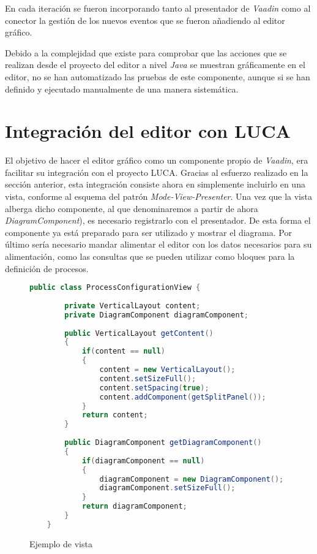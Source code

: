 En cada iteración se fueron incorporando tanto al presentador de \emph{Vaadin} como al conector la gestión de los nuevos eventos que se fueron añadiendo al editor gráfico.

Debido a la complejidad que existe para comprobar que las acciones que se realizan desde el proyecto del editor a nivel \emph{Java} se muestran gráficamente en el editor, no se han automatizado las pruebas de este componente, aunque si se han definido y ejecutado manualmente de una manera sistemática. 

\section{Integración del editor con LUCA}

El objetivo de hacer el editor gráfico como un componente propio de \emph{Vaadin}, era facilitar su integración con el proyecto LUCA. Gracias al esfuerzo realizado en la sección anterior, esta integración consiste ahora en simplemente incluirlo en una vista, conforme al esquema del patrón \emph{Mode-View-Presenter}. Una vez que la vista alberga dicho componente, al que denominaremos a partir de ahora  \emph{DiagramComponent}), es necesario registrarlo con el presentador. De esta forma el componente ya está preparado para ser utilizado y mostrar el diagrama. Por último sería necesario mandar alimentar el editor con los datos necesarios para su alimentación, como las consultas que se pueden utilizar como bloques para la definición de procesos.



\begin{figure}[H]
	\centering
	\begin{lstlisting}[language=Java]
	public class ProcessConfigurationView {
			
		private VerticalLayout content;
		private DiagramComponent diagramComponent;
		
		public VerticalLayout getContent()
		{
			if(content == null)
			{
				content = new VerticalLayout();
				content.setSizeFull();
				content.setSpacing(true);
				content.addComponent(getSplitPanel());
			}
			return content;
		}
		
		public DiagramComponent getDiagramComponent()
		{
			if(diagramComponent == null)
			{
				diagramComponent = new DiagramComponent();
				diagramComponent.setSizeFull();
			}
			return diagramComponent;
		}
	}\end{lstlisting}
	\caption{Ejemplo de vista}
	\label{fig:viewExample}
\end{figure}

